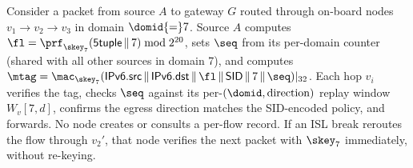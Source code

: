 Consider a packet from source $A$ to gateway $G$
routed through on-board nodes $v_1{\to}v_2{\to}v_3$ in domain $\domid{=}7$.
Source $A$ computes $\fl=\prf_{\skey_7}(\textsf{5tuple}\,\|\,7)\bmod 2^{20}$,
sets $\seq$ from its per-domain counter (shared with all other sources in domain 7), and computes
$\mtag=\mac_{\skey_7}(\textsf{IPv6.src}\,\|\,\textsf{IPv6.dst}\,\|\,\fl\,\|\,\textsf{SID}\,\|\,7\,\|\,\seq)|_{32}$.
Each hop $v_i$ verifies the tag, checks $\seq$ against its per-$(\domid, \text{direction})$ replay window $W_v[7, d]$,
confirms the egress direction matches the SID-encoded policy, and forwards.
No node creates or consults a per-flow record. If an ISL break reroutes the flow through $v_2'$,
that node verifies the next packet with $\skey_7$ immediately, without re-keying.
